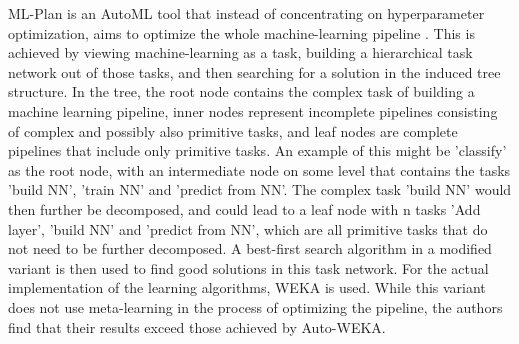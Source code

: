 ML-Plan is an AutoML tool that instead of concentrating on hyperparameter optimization, aims to optimize the whole machine-learning pipeline \cite{wever2017automatic}. This is achieved by viewing machine-learning as a task, building a hierarchical task network out of those tasks, and then searching for a solution in the induced tree structure. In the tree, the root node contains the complex task of building a machine learning pipeline, inner nodes represent incomplete pipelines consisting of complex and possibly also primitive tasks, and leaf nodes are complete pipelines that include only primitive tasks. An example of this might be 'classify' as the root node, with an intermediate node on some level that contains the tasks 'build NN', 'train NN' and 'predict from NN'. The complex task 'build NN' would then further be decomposed, and could lead to a leaf node with n tasks 'Add layer', 'build NN' and 'predict from NN', which are all primitive tasks that do not need to be further decomposed. A best-first search algorithm in a modified variant is then used to find good solutions in this task network. For the actual implementation of the learning algorithms, WEKA is used. While this variant does not use meta-learning in the process of optimizing the pipeline, the authors find that their results exceed those achieved by Auto-WEKA.\\

